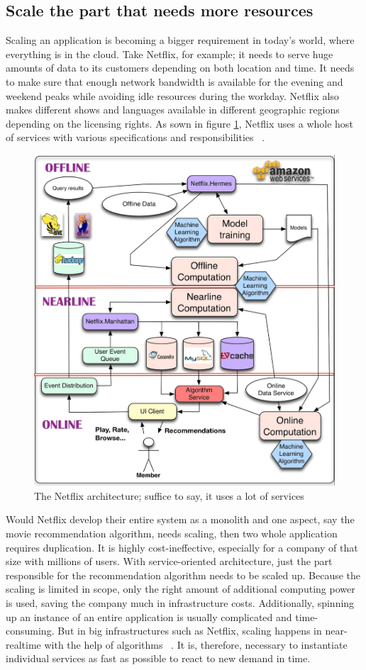 \subsection{Scale the part that needs more resources}

Scaling an application is becoming a bigger requirement in today's world, where everything is in the cloud. Take Netflix, for example; it needs to serve huge amounts of data to its customers depending on both location and time. It needs to make sure that enough network bandwidth is available for the evening and weekend peaks while avoiding idle resources during the workday. Netflix also makes different shows and languages available in different geographic regions depending on the licensing rights. As sown in figure \ref{fix:netflix-architecture}, Netflix uses a whole host of services with various specifications and responsibilities ~\cite{netflix.2013}.

\begin{figure}[ht]
  \centering
  \includegraphics[width=0.4\linewidth]{assets/netflix-architecture.png}
  \caption{The Netflix architecture; suffice to say, it uses a lot of services}
  \label{fix:netflix-architecture}
\end{figure}

Would Netflix develop their entire system as a monolith and one aspect, say the movie recommendation algorithm, needs scaling, then two whole application requires duplication. It is highly cost-ineffective, especially for a company of that size with millions of users. With service-oriented architecture, just the part responsible for the recommendation algorithm needs to be scaled up. Because the scaling is limited in scope, only the right amount of additional computing power is used, saving the company much in infrastructure costs. Additionally, spinning up an instance of an entire application is usually complicated and time-consuming. But in big infrastructures such as Netflix, scaling happens in near-realtime with the help of algorithms ~\cite{netflix.2013}. It is, therefore, necessary to instantiate individual services as fast as possible to react to new demand in time.

